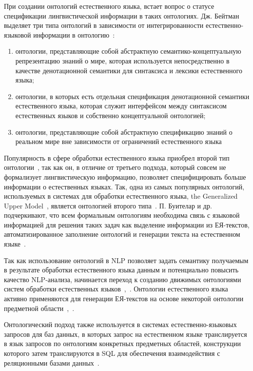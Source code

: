 При создании онтологий естественного языка, встает вопрос о статусе спецификации лингвистической информации в таких онтологиях.
Дж. Бейтман выделяет три типа онтологий в зависимости от интегрированности естественно-языковой информации в онтологию~\cite{Bateman_1997}:
\begin{enumerate}
    \item онтологии, представляющие собой абстрактную семантико-концептуальную репрезентацию знаний о мире, которая используется непосредственно в качестве денотационной семантики для синтаксиса и лексики естественного языка;
    \item онтологии, в которых есть отдельная спецификация денотационной семантики естественного языка, которая служит интерфейсом между синтаксисом естественных языков и собственно концептуальной онтологией;
    \item онтологии, представляющие собой абстрактную спецификацию знаний о реальном мире вне зависимости от ограничений естественного языка
\end{enumerate}

Популярность в сфере обработки естественного языка приобрел второй тип онтологии~\cite[p.~8]{Bateman_1997}, так как он, в отличие от третьего подхода, который совсем не формализует лингвистическую информацию, позволяет специфицировать больше информации о естественных языках.
Так, одна из самых популярных онтологий, используемых в системах для обработки естественного языка, the Generalized Upper Model~\cite{Bateman2002TheGU}, является онтологией второго типа~\cite{Bateman_1997}.
П.
Буителар и др.
подчеркивают, что всем формальным онтологиям необходима связь с языковой информацией для решения таких задач как выделение информации из ЕЯ-текстов, автоматизированное заполнение онтологий и генерации текста на естественном языке~\cite{Buitelaar_2009}.

Так как использование онтологий в NLP позволяет задать семантику получаемым в результате обработки естественного языка данным и потенциально повысить качество NLP-анализа, начинается переход к созданию движимых онтологиями систем обработки естественных языков~\cite{Kostareva2016UsingOM},~\cite{nevzorova_2019}.
Онтологии естественного языка активно применяются для генерации ЕЯ-текстов на основе некоторой онтологии предметной области~\cite{cimiano-etal-2013-exploiting},~\cite{Bouayad_2014}.

Онтологический подход также используется в системах естественно-языковых запросов для баз данных, в которых запрос на естественном языке транслируется в язык запросов по онтологиям конкретных предметных областей, конструкции которого затем транслируются в SQL для обеспечения взаимодействия с реляционными базами данных~\cite{saha_2016}.

